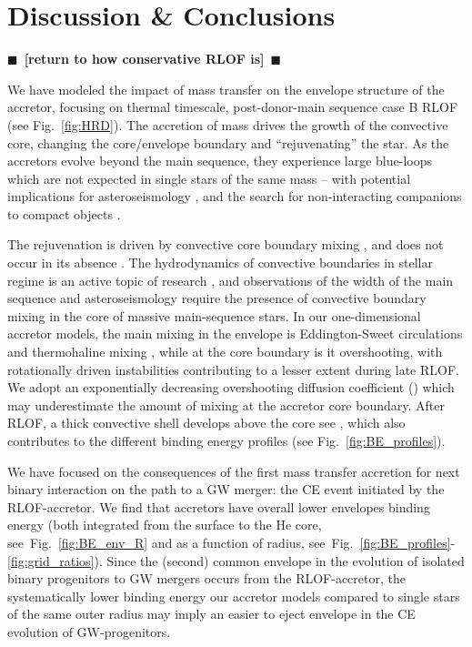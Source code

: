 \documentclass[twocolumn,twocolappendix,trackchanges]{aastex63}
\DeclareRobustCommand{\Figref}[1]{Fig.~\ref{#1}}
\newcommand{\todo}[1]{{\large $\blacksquare$~\textbf{\color{red}[#1]}}~$\blacksquare$}
\begin{document}
{\section{Discussion \& Conclusions}
\label{sec:conclusions}

\todo{return to how conservative RLOF is}

We have modeled the impact of mass transfer on the envelope structure
of the accretor, focusing on thermal timescale, post-donor-main
sequence case B RLOF (see \Figref{fig:HRD}). The accretion of mass
drives the growth of the convective core, changing the core/envelope
boundary and ``rejuvenating'' the star. As the accretors evolve
beyond the main sequence, they experience large blue-loops which are
not expected in single stars of the same mass -- with potential
implications for asteroseismology \citep[e.g.,][]{dorn-wallenstein:20},
and the search for non-interacting companions to compact objects
\citep[e.g.,][]{breivik:17, andrews:19, chawla:21}.

The rejuvenation is driven by convective core boundary mixing
\citep[e.g.,][]{hellings:1983, hellings:1984, renzo:2021zoph}, and
does not occur in its absence \citep{braun:95}. The hydrodynamics of
convective boundaries in stellar regime is an active topic of research
\citep[e.g.,][]{anders:22a, anders:22b}, and observations of the width
of the main sequence \citep[e.g.,][]{brott:11} and asteroseismology
\citep[e.g.,][]{moravveji:16} require the presence of convective
boundary mixing in the core of massive main-sequence stars. In our
one-dimensional accretor models, the main mixing in the envelope is
Eddington-Sweet circulations and thermohaline mixing
\citep{renzo:2021zoph}, while at the core boundary is it overshooting,
with rotationally driven instabilities contributing to a lesser extent
during late RLOF. We adopt an exponentially decreasing overshooting
diffusion coefficient (\citealt{claret:17}) which may underestimate
the amount of mixing at the accretor core boundary. After RLOF, a
thick convective shell develops above the core see
\citep[see][]{renzo:2021zoph}, which also contributes to the different
binding energy profiles (see \Figref{fig:BE_profiles}).

We have focused on the consequences of the first mass transfer
accretion for next binary interaction on the path to a GW merger: the
CE event initiated by the RLOF-accretor. We find that accretors have
overall lower envelopes binding energy (both integrated from the
surface to the He core, see~\Figref{fig:BE_env_R} and as a function of
radius, see~\Figref{fig:BE_profiles}-\ref{fig:grid_ratios}). Since the
(second) common envelope in the evolution of isolated binary
progenitors to GW mergers occurs from the RLOF-accretor, the
systematically lower binding energy our accretor models compared to
single stars of the same outer radius may imply an easier to eject
envelope in the CE evolution of GW-progenitors.

}
\end{document}
